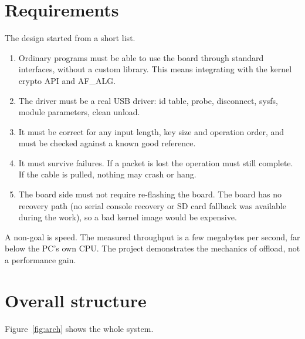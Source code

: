 \documentclass[11pt,a4paper,oneside]{report}
\begin{document}
\section{Requirements}

The design started from a short list.

\begin{enumerate}
  \item Ordinary programs must be able to use the board through standard interfaces, without a custom library. This means integrating with the kernel crypto API and AF\_ALG.
  \item The driver must be a real USB driver: id table, probe, disconnect, sysfs, module parameters, clean unload.
  \item It must be correct for any input length, key size and operation order, and must be checked against a known good reference.
  \item It must survive failures. If a packet is lost the operation must still complete. If the cable is pulled, nothing may crash or hang.
  \item The board side must not require re-flashing the board. The board has no recovery path (no serial console recovery or SD card fallback was available during the work), so a bad kernel image would be expensive.
\end{enumerate}

A non-goal is speed. The measured throughput is a few megabytes per second, far below the PC's own CPU. The project demonstrates the mechanics of offload, not a performance gain.

\section{Overall structure}

Figure~\ref{fig:arch} shows the whole system.
\end{document}

